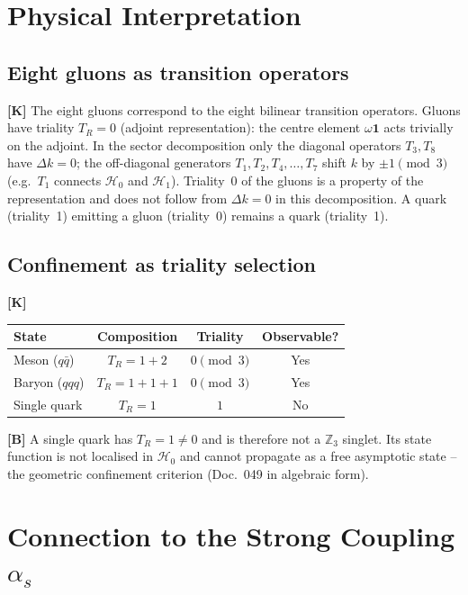 \section{Physical Interpretation}

\subsection{Eight gluons as transition operators}

\textbf{[K]} The eight gluons correspond to the eight bilinear
transition operators. Gluons have triality $T_R=0$ (adjoint
representation): the centre element $\omega\mathbf{1}$ acts trivially on
the adjoint. In the sector decomposition only the diagonal operators
$T_3, T_8$ have $\Delta k = 0$; the off-diagonal generators
$T_1, T_2, T_4, \ldots, T_7$ shift $k$ by $\pm1 \pmod{3}$ (e.g.\ $T_1$
connects $\mathcal{H}_0$ and $\mathcal{H}_1$). Triality~0 of the gluons is
a property of the representation and does not follow from $\Delta k = 0$
in this decomposition. A quark (triality~1) emitting a gluon (triality~0) remains
a quark (triality~1).

\subsection{Confinement as triality selection}

\textbf{[K]}
\begin{center}
\begin{tabular}{lccc}
\toprule
State & Composition & Triality & Observable? \\
\midrule
Meson ($q\bar{q}$) & $T_R = 1+2$ & $0\pmod{3}$ & Yes \\
Baryon ($qqq$)     & $T_R = 1+1+1$ & $0\pmod{3}$ & Yes \\
Single quark       & $T_R = 1$ & $1$ & No \\
\bottomrule
\end{tabular}
\end{center}

\textbf{[B]} A single quark has $T_R=1\neq0$ and is therefore not a
$\mathbb{Z}_3$ singlet. Its state function is not localised in
$\mathcal{H}_0$ and cannot propagate as a free asymptotic state --
the geometric confinement criterion (Doc.~049 in algebraic form).

\section{Connection to the Strong Coupling $\alpha_s$}

